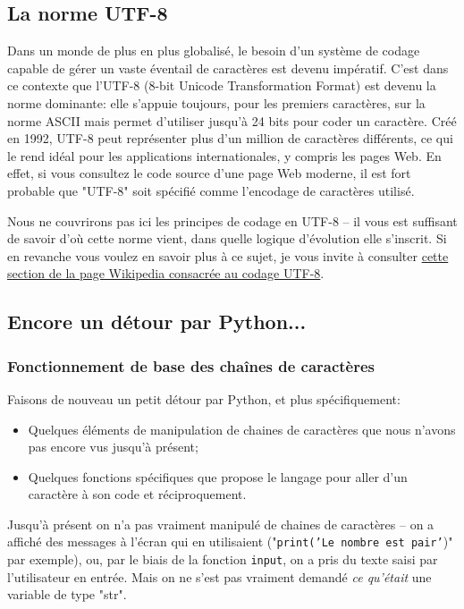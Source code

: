 \documentclass[12pt]{article}
\begin{document}
	\subsection{La norme UTF-8}
	Dans un monde de plus en plus globalisé, le besoin d'un système de codage capable de gérer un vaste éventail de caractères est devenu impératif. C’est dans ce contexte que l'UTF-8 (8-bit Unicode Transformation Format) est devenu la norme dominante: elle s'appuie toujours, pour les premiers caractères, sur la norme ASCII mais permet d'utiliser jusqu'à 24 bits pour coder un caractère. Créé en 1992, UTF-8 peut représenter plus d’un million de caractères différents, ce qui le rend idéal pour les applications internationales, y compris les pages Web. En effet, si vous consultez le code source d’une page Web moderne, il est fort probable que "UTF-8" soit spécifié comme l’encodage de caractères utilisé.
	
	Nous ne couvrirons pas ici les principes de codage en UTF-8 -- il vous est suffisant de savoir d'où cette norme vient, dans quelle logique d'évolution elle s'inscrit. Si en revanche vous voulez en savoir plus à ce sujet, je vous invite à consulter \href{https://fr.wikipedia.org/wiki/UTF-8#Description_technique}{cette section de la page Wikipedia consacrée au codage UTF-8}.
	
	
	\subsection{Encore un détour par Python...}
	\subsubsection*{Fonctionnement de base des chaînes de caractères}
	Faisons de nouveau un petit détour par Python, et plus spécifiquement:
	\begin{itemize}
		\item Quelques éléments de manipulation de chaines de caractères que nous n'avons pas encore vus jusqu'à présent;
		\item Quelques fonctions spécifiques que propose le langage pour aller d'un caractère à son code et réciproquement.
	\end{itemize}
	
	Jusqu'à présent on n'a pas vraiment manipulé de chaines de caractères -- on a affiché des messages à l'écran qui en utilisaient ("\texttt{print('Le nombre est pair'})" par exemple), ou, par le biais de la fonction \texttt{input}, on a pris du texte saisi par l'utilisateur en entrée. Mais on ne s'est pas vraiment demandé \textit{ce qu'était} une variable de type "str".
\end{document}
